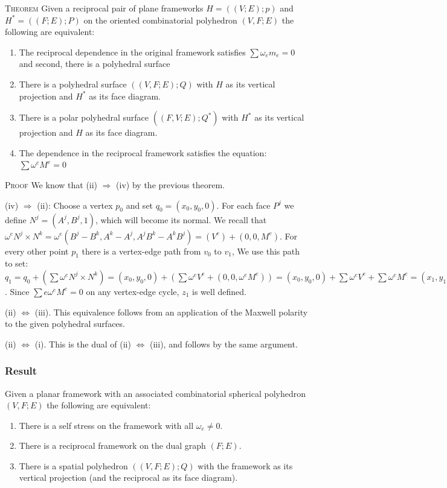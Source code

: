 \documentclass[11pt]{article}
\begin{document}
 \textsc{Theorem} Given a reciprocal pair of plane frameworks $H=((V;E);p)$ and $H^* = ((F;E);P)$ on the oriented combinatorial polyhedron $(V,F;E)$ the following are equivalent: 
 \begin{enumerate} 
 	\item The reciprocal dependence in the original framework satisfies $\sum \omega_em_e = 0$ and second, there is a polyhedral surface 
 	\item There is a polyhedral surface $((V,F;E);Q)$ with $H$ as its vertical projection and $H^*$ as its face diagram.
	\item There is a polar polyhedral surface $((F,V;E);Q^*)$ with $H^*$ as its vertical projection and $H$ as its face diagram.
	\item The dependence in the reciprocal framework satisfies the equation: $\sum \omega^eM^e = 0$
\end{enumerate}
\textsc{Proof} We know that (ii) $\Rightarrow$ (iv) by the previous theorem. 

(iv) $\Rightarrow$ (ii): Choose a vertex $p_0$ and set $q_0 = (x_0, y_0,0)$. For each face $P^j$ we define $N^j = (A^j,B^j,1)$, which will become its normal. We recall that $\omega^eN^j \times N^k = \omega^e(B^j-B^k,A^k-A^j, A^jB^k-A^kB^j) = (V^e) + (0,0,M^e)$. For every other point $p_1$ there is a vertex-edge path from $v_0$ to $v_1$, We use this path to set: $q_1 = q_0 + (\sum \omega^eN^j \times N^k) = (x_0,y_0,0) + (\sum \omega^eV^e + (0,0,\omega^eM^e)) = (x_0,y_0,0) + \sum \omega^eV^e + \sum \omega^eM^e = (x_1,y_1,0) + (0,0,\sum \omega_eM^e)$. Since $\sum{e}\omega^eM^e = 0$ on any vertex-edge cycle, $z_1$ is well defined.

(ii) $\Leftrightarrow$ (iii). This equivalence follows from an application of the Maxwell polarity to the given polyhedral surfaces.

(ii) $\Leftrightarrow$ (i). This is the dual of (ii) $\Leftrightarrow$ (iii), and follows by the same argument. 

 
 
\subsubsection{Result}

Given a planar framework with an associated combinatorial spherical polyhedron $(V,F;E)$ the following are equivalent:
\begin{enumerate}
	\item There is a self stress on the framework with all $\omega_e \neq 0$.
	\item There is a reciprocal framework on the dual graph $(F;E)$.
	\item There is a spatial polyhedron $((V,F;E);Q)$ with the framework as its vertical projection (and the reciprocal as its face diagram).
 \end{enumerate}
 
\end{document}
